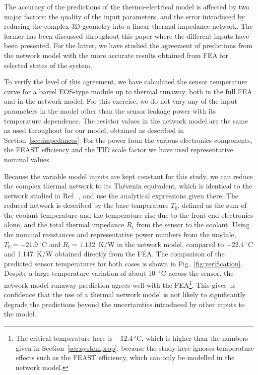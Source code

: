 The accuracy of the predictions of the thermo-electrical model is affected by two major factors: the quality of the input parameters, and the error introduced by reducing the complex 3D geometry into a linear thermal impedance network. The former has been discussed throughout this paper where the different inputs have been presented. For the latter, we have studied the agreement of predictions from the network model with the more accurate results obtained from FEA for selected states of the system.

To verify the level of this agreement, we have calculated the sensor temperature curve for a barrel EOS-type module up to thermal runaway, both in the full FEA and in the network model. For this exercise, we do not vary any of the input parameters in the model other than the sensor leakage power with its temperature dependence. The resistor values in the network model are the same as used throughout for our model, obtained as described in Section~\ref{sec:impedances}. For the power from the various electronics components, the FEAST efficiency and the TID scale factor we have used representative nominal values.

Because the variable model inputs are kept constant for this study, we can reduce the complex thermal network to its Th\'{e}venin equivalent, which is identical to the network studied in Ref.~\cite{Beck:2010zzd}, and use the analytical expressions given there. The reduced network is described by the base temperature $T_0$, defined as the sum of the coolant temperature and the temperature rise due to the front-end electronics alone, and the total thermal impedance $R_t$ from the sensor to the coolant. Using the nominal resistances and representative power numbers from the module, $T_0=-21.9~^\circ$C and $R_t=1.132$~K/W in the network model, compared to $-22.4~^\circ$C and 1.147~K/W obtained directly from the FEA. The comparison of the predicted sensor temperatures for both cases is shown in Fig.~\ref{fig:verification}. Despite a large temperature variation of about 10~$^\circ$C across the sensor, the network model runaway prediction agrees well with the FEA\footnote{The critical temperature here is $-12.4~^\circ$C, which is higher than the numbers given in Section~\ref{sec:systemprop}, because the study here ignores temperature effects such as the FEAST efficiency, which can only be modelled in the network model.}. This gives us confidence that the use of a thermal network model is not likely to significantly degrade the predictions beyond the uncertainties introduced by other inputs to the model. 

